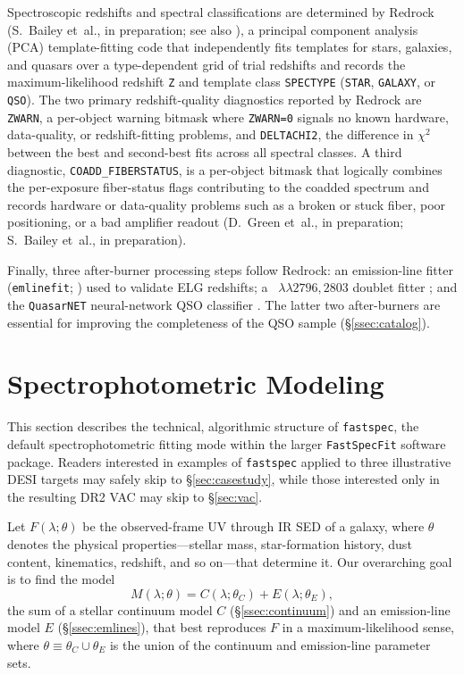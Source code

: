 \documentclass[modern,linenumbers]{aastex702}
\newcommand{\fastspecfit}{\texttt{FastSpecFit}}
\newcommand{\fastspec}{\texttt{fastspec}}
\newcommand{\mgiidoublet}{\ion{Mg}{2}~$\lambda\lambda2796,2803$}
\begin{document}
Spectroscopic redshifts and spectral classifications are determined by
Redrock (S.~Bailey et~al., in preparation; see also
\citealt{guy23a, anand24a}), a
principal component analysis (PCA) template-fitting code that
independently fits templates for stars, galaxies, and quasars over a
type-dependent grid of trial redshifts and records the
maximum-likelihood redshift \texttt{Z} and template class
\texttt{SPECTYPE} (\texttt{STAR}, \texttt{GALAXY}, or
\texttt{QSO}). The two primary redshift-quality diagnostics reported by
Redrock are \texttt{ZWARN}, a per-object warning bitmask where
\texttt{ZWARN=0} signals no known hardware, data-quality, or
redshift-fitting problems, and \texttt{DELTACHI2}, the difference in
$\chi^2$ between the best and second-best fits across all spectral
classes. A third diagnostic, \texttt{COADD\_FIBERSTATUS}, is a
per-object bitmask that logically combines the per-exposure
fiber-status flags contributing to the coadded spectrum and records
hardware or data-quality problems such as a broken or stuck fiber,
poor positioning, or a bad amplifier readout (D.~Green et~al., in
preparation; S.~Bailey et~al., in preparation).

Finally, three after-burner processing steps follow Redrock: an
emission-line fitter (\texttt{emlinefit}; \citealt{raichoor23a,
  desi-collaboration24d}) used to validate ELG redshifts; a
\mgiidoublet{} doublet fitter \citep{chaussidon23a}; and the
\texttt{QuasarNET} neural-network QSO classifier \citep{busca18a,
  green25a}. The latter two after-burners are essential for
improving the completeness of the QSO sample
(\S\ref{ssec:catalog}).

\section{Spectrophotometric Modeling}
\label{sec:modeling}

This section describes the technical, algorithmic structure of
\fastspec, the default spectrophotometric fitting mode within the
larger \fastspecfit{} software package. Readers interested in examples
of \fastspec{} applied to three illustrative DESI targets may safely
skip to \S\ref{sec:casestudy}, while those interested only in the
resulting DR2 VAC may skip to \S\ref{sec:vac}.

Let $F(\lambda;\theta)$ be the observed-frame UV through IR SED of a
galaxy, where $\theta$ denotes the physical properties---stellar mass,
star-formation history, dust content, kinematics, redshift, and so
on---that determine it.
Our overarching goal is to find the model
\begin{equation}
  M(\lambda;\theta) = C(\lambda;\theta_C) + E(\lambda;\theta_E),
  \label{eq:totmodel}
\end{equation}
the sum of a stellar continuum model $C$ (\S\ref{ssec:continuum}) and
an emission-line model $E$ (\S\ref{ssec:emlines}), that best
reproduces $F$ in a maximum-likelihood sense, where $\theta \equiv
\theta_C \cup \theta_E$ is the union of the continuum and
emission-line parameter sets.
\end{document}
